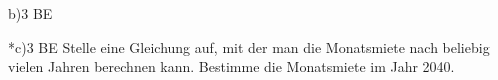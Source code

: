 \documentclass[11pt]{article}
\begin{document}
\begin{pfaufg}{}{b)}{3 BE}
\end{pfaufg}
\begin{pfaufg}{}{*c)}{3 BE}
Stelle eine Gleichung auf, mit der man die Monatsmiete nach beliebig vielen Jahren berechnen kann. Bestimme die Monatsmiete im Jahr 2040.
\end{pfaufg}
\end{document}
